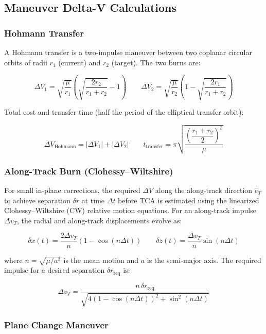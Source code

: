 \documentclass[11pt, a4paper]{article}
\begin{document}
\subsection{Maneuver Delta-V Calculations}

\subsubsection{Hohmann Transfer}

A Hohmann transfer is a two-impulse maneuver between two coplanar circular orbits of radii
$r_1$ (current) and $r_2$ (target). The two burns are:

\[
  \Delta V_1 = \sqrt{\frac{\mu}{r_1}}\left(\sqrt{\frac{2r_2}{r_1+r_2}} - 1\right)
  \qquad
  \Delta V_2 = \sqrt{\frac{\mu}{r_2}}\left(1 - \sqrt{\frac{2r_1}{r_1+r_2}}\right)
\]

Total cost and transfer time (half the period of the elliptical transfer orbit):

\[
  \Delta V_{\text{Hohmann}} = |\Delta V_1| + |\Delta V_2|
  \qquad
  t_{\text{transfer}} = \pi\sqrt{\frac{\left(\dfrac{r_1+r_2}{2}\right)^3}{\mu}}
\]

\subsubsection{Along-Track Burn (Clohessy--Wiltshire)}

For small in-plane corrections, the required $\Delta V$ along the along-track direction
$\hat{e}_T$ to achieve separation $\delta r$ at time $\Delta t$ before TCA is estimated
using the linearized Clohessy--Wiltshire (CW) relative motion equations. For an along-track
impulse $\Delta v_T$, the radial and along-track displacements evolve as:

\[
  \delta x(t) = \frac{2\Delta v_T}{n}\left(1 - \cos(n\Delta t)\right)
  \qquad
  \delta z(t) = \frac{\Delta v_T}{n}\sin(n\Delta t)
\]

where $n = \sqrt{\mu / a^3}$ is the mean motion and $a$ is the semi-major axis. The required
impulse for a desired separation $\delta r_{\text{req}}$ is:

\[
  \Delta v_T = \frac{n\,\delta r_{\text{req}}}{\sqrt{4\left(1 - \cos(n\Delta t)\right)^2 + \sin^2(n\Delta t)}}
\]

\subsubsection{Plane Change Maneuver}
\end{document}
